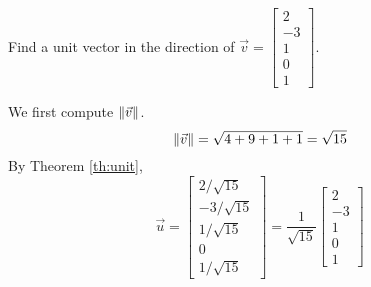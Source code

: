 \documentclass{ximera}
\begin{document}
 
\begin{example}\label{reference}
Find a unit vector in the direction of $\vec{v}=\begin{bmatrix}2\\-3\\1\\0\\1\end{bmatrix}$.
 
\begin{explanation}
We first compute $\left\|\vec{v}\right\|$.
$$\left\|\vec{v}\right\|=\sqrt{4+9+1+1}=\sqrt{15}$$
By Theorem \ref{th:unit},
$$\vec{u}=\begin{bmatrix}2/\sqrt{15}\\-3/\sqrt{15}\\1/\sqrt{15}\\0\\1/\sqrt{15}\end{bmatrix}=\frac{1}{\sqrt{15}}\begin{bmatrix}2\\-3\\1\\0\\1\end{bmatrix}$$
\end{explanation}
\end{example}

 
\end{document}
